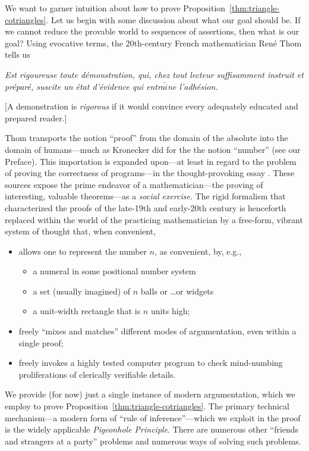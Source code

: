 We want to garner intuition about how to prove Proposition~\ref{thm:triangle-cotriangles}.  Let us begin with some discussion about what our goal should be.  If we cannot reduce the provable world to sequences of assertions, then what is our goal?  Using evocative terms, the 20th-century French mathematician Ren\'{e} Thom tells us

\bigskip

\begin{minipage}{0.96\textwidth}
{\em Est rigoureuse toute d\'{e}monstration, qui, chez tout lecteur suffisamment instruit et pr\'{e}par\'{e}, suscite un \'{e}tat d'\'{e}vidence qui entra$\hat{i}$ne l'adh\'{e}sion.}

\smallskip

[A demonstration is {\em rigorous} if it would convince every adequately educated and prepared reader.]
\end{minipage}

\bigskip

\noindent
Thom transports the notion ``proof'' from the domain of the absolute into the domain of humans---much as Kronecker did for the the notion ``number'' (see our Preface).  This importation is expanded upon---at least in regard to the problem of proving the correctness of
programs---in the thought-provoking essay \cite{DeMilloLP79}.  These sources expose the prime endeavor of a mathematician---the proving of interesting, valuable theorems---as a {\em social exercise}.  The rigid formalism that characterized the proofs of the late-19th and early-20th century is henceforth replaced within the world of the practicing mathematician by a free-form, vibrant system of thought that, when convenient,
\begin{itemize}
\item
allows one to represent the number $n$, as convenient, by, e.g.,
  \begin{itemize}
  \item
a numeral in some positional number system
  \item
a set (usually imagined) of $n$ balls or \ldots or widgets
  \item
a unit-width rectangle that is $n$ units high;
  \end{itemize}

\item
freely ``mixes and matches'' different modes of argumentation, even within a single proof;

\item
freely invokes a highly tested computer program to check mind-numbing proliferations of clerically verifiable details.
\end{itemize}
We provide (for now) just a single instance of modern argumentation, which we employ to prove Proposition~\ref{thm:triangle-cotriangles}.  The primary technical mechanism---a modern form of ``rule of inference''---which we exploit in the proof is the widely applicable {\it Pigeonhole Principle}.  There are numerous other ``friends and strangers at a party'' problems and numerous ways of solving such problems.

